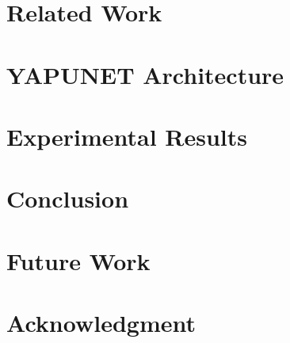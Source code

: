 \documentclass[conference]{IEEEtran}
\begin{document}
\section{Related Work}
\label{sec:related}
\section{YAPUNET Architecture}
\label{sec:architecture}
\section{Experimental Results}
\label{sec:results}
\section{Conclusion}
\label{sec:conclusion}
\section{Future Work}
\label{sec:future}
\section*{Acknowledgment}

\end{document}
